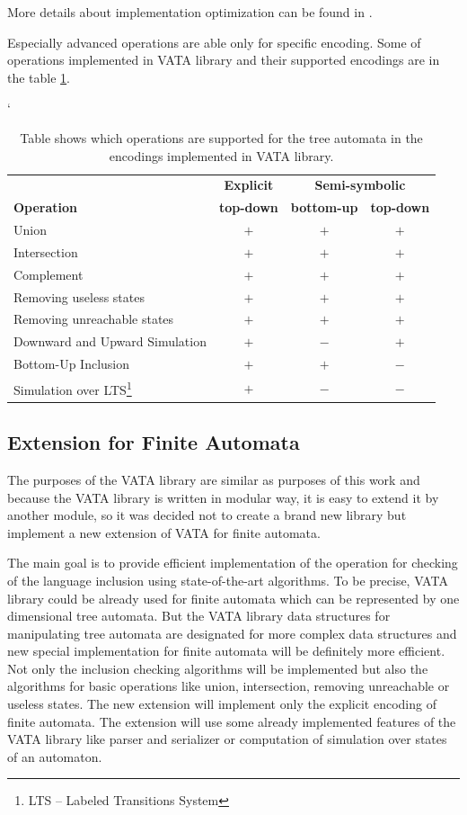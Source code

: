 More details about implementation optimization can be found in \cite{libvata}.

Especially advanced operations are able only for specific encoding. Some of operations implemented in VATA library and their supported encodings are in 
the table \ref{tabOp}.
\begin{savenotes}
\begin{table}[h]
	\begin{center}
		\catcode`
		\begin{tabular}{| l | c | c | c |} \hline
		& {\textbf{Explicit}} & \multicolumn{2}{|c|}{\textbf{Semi-symbolic}} \\ \cline{2-4}
		\textbf{Operation} & \textbf{top-down} & \textbf{bottom-up} & \textbf{top-down} \\ \hline
		Union & $+$ & $+$ & $+$ \\
		Intersection & $+$ & $+$ & $+$ \\
		Complement & $+$ & $+$ & $+$ \\
		Removing useless states & $+$ & $+$ & $+$ \\
		Removing unreachable states & $+$ & $+$ & $+$ \\
		Downward and Upward Simulation & $+$ & $-$ & $+$ \\
		Bottom-Up Inclusion  & $+$ & $+$ & $-$ \\ 
		Simulation over LTS\footnote{LTS -- Labeled Transitions System} & $+$ & $-$ & $-$ \\ \hline
		\end{tabular}
	\caption{Table shows which operations are supported for the tree automata in the encodings implemented in VATA library.}
	\label{tabOp}
	\end{center}
\end{table}
\end{savenotes}


\subsection{Extension for Finite Automata}
The purposes of the VATA library are similar as purposes of this work and because the VATA library is written in modular way, it is easy 
to extend it by another module, so it was decided not to create a brand new library but implement a new extension of VATA for finite automata.

The main goal is to provide efficient implementation of the operation for checking of the language inclusion using state-of-the-art algorithms. 
To be precise, VATA library could be already used for finite automata which can be represented by one dimensional
tree automata. But the VATA library data structures for manipulating tree automata are designated for more complex data structures
and new special implementation for finite automata will be definitely more efficient. 
Not only the inclusion checking algorithms will be implemented but also the algorithms for basic operations like union, intersection, removing unreachable or 
useless states. The new extension will implement only the explicit encoding of finite automata. 
The extension will use some already implemented features of the VATA library like parser and serializer or computation of simulation over states of an automaton.

